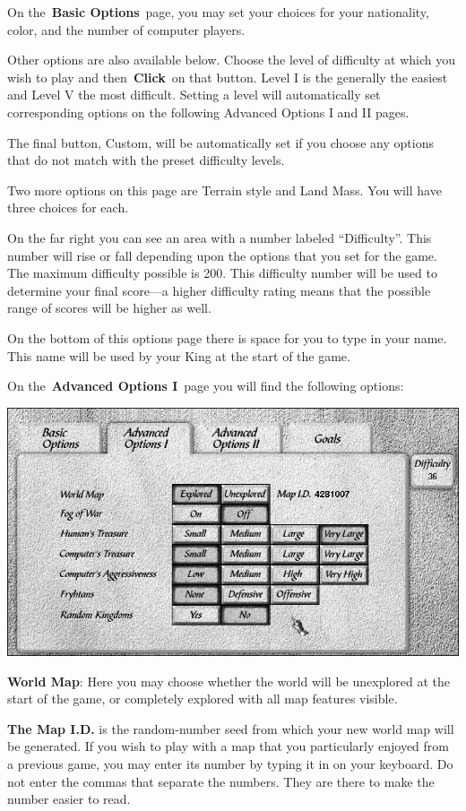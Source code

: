 On the \textbf{Basic Options} page, you may set your choices for your nationality, color, and the number of computer players.

Other options are also available below. Choose the level of difficulty at which you wish to play and then \textbf{Click} on that button. Level I is the generally the easiest and Level V the most difficult. Setting a level will automatically set corresponding options on the following Advanced Options I and II pages.

The final button, Custom, will be automatically set if you choose any options that do not match with the preset difficulty levels.

Two more options on this page are Terrain style and Land Mass. You will have three choices for each.

On the far right you can see an area with a number labeled “Difficulty”. This number will rise or fall depending upon the options that you set for the game. The maximum difficulty possible is 200. This difficulty number will be used to determine your final score---a higher difficulty rating means that the possible range of scores will be higher as well.

On the bottom of this options page there is space for you to type in your name. This name will be used by your King at the start of the game.

On the \textbf{Advanced Options I} page you will find the following options:

\begin{center}
	\includegraphics[width=0.9\linewidth]{Iadvancedoptions1}
\end{center}

\textbf{World Map}: Here you may choose whether the world will be unexplored at the start of the game, or completely explored with all map features visible.

\begin{changemargin}{0.5cm}{0cm} 
 \textbf{The Map I.D.} is the random-number seed from which your new world map will be generated. If you wish to play with a map that you particularly enjoyed from a previous game, you may enter its number by typing it in on your keyboard. Do not enter the commas that separate the numbers. They are there to make the number easier to read.
\end{changemargin}

